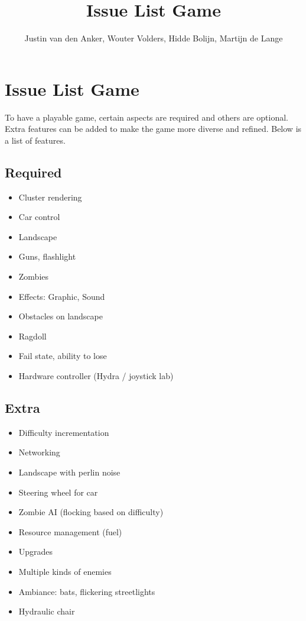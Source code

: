 \documentclass[10pt,a4paper]{article}
\author{Justin van den Anker, Wouter Volders, Hidde Bolijn, Martijn de Lange}
\title{Issue List Game}
\begin{document}
\maketitle
\section{Issue List Game}
To have a playable game, certain aspects are required and others are optional. Extra features can be added to make the game more diverse and refined. Below is a list of features.
\subsection{Required}

\begin{itemize}
	\item Cluster rendering
	\item Car control
	\item Landscape
	\item Guns, flashlight
	\item Zombies
	\item Effects: Graphic, Sound
	\item Obstacles on landscape
	\item Ragdoll
	\item Fail state, ability to lose
	\item Hardware controller (Hydra / joystick lab)
\end{itemize}
\subsection{Extra}
\begin{itemize}

	\item Difficulty incrementation
	\item Networking
	\item Landscape with perlin noise
	\item Steering wheel for car
	\item Zombie AI (flocking based on difficulty)
	\item Resource management (fuel)
	\item Upgrades
	\item Multiple kinds of enemies
	\item Ambiance: bats, flickering streetlights
	\item Hydraulic chair  
\end{itemize}
\end{document}

